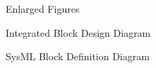 \documentclass{matthijs}
\begin{document}
\begin{appendices}
\begin{hoofdstuk}{Enlarged Figures}
\begin{paragraaf}{Integrated Block Design Diagram}
			\end{paragraaf}

			\begin{paragraaf}{SysML Block Definition Diagram}
				\vspace{4ex}
				\centerline{
					\scalebox{0.95} {
						\hspace{3.35cm}
					}
				}
			\end{paragraaf}
		\end{hoofdstuk}
	\end{appendices}

	\clearpage
	\thispagestyle{empty}
	\addtocounter{page}{-1}
	\
	\clearpage
\end{document}
